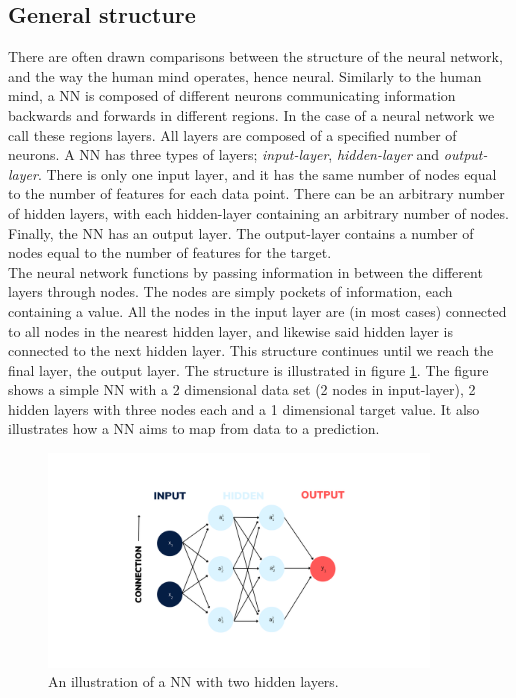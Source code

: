 \subsection{General structure}
There are often drawn comparisons between the structure of the neural network, 
and the way the human mind operates, hence neural. Similarly to the human mind, a \ac{NN} is 
composed of different neurons communicating information backwards and forwards in different 
regions. In the case of a neural network we call these regions layers. All layers
are composed of a specified number of neurons. A \ac{NN} has three types of layers;
\emph{input-layer}, \emph{hidden-layer} and \emph{output-layer}. There is only one input layer, and it has
the same number of nodes equal to the number of features for each data point. 
There can be an arbitrary number of hidden layers, with each hidden-layer containing
an arbitrary number of nodes. Finally, the \ac{NN} has an output layer. The output-layer
contains a number of nodes equal to the number of features for the target.
\\
The neural network functions by passing information in between the different layers through 
nodes. The nodes are simply pockets of information, each containing a value. 
All the nodes in the input layer are (in most cases) connected to all nodes in the nearest hidden layer,
and likewise said hidden layer is connected to the next hidden layer. This structure continues
until we reach the final layer, the output layer. The structure is illustrated in figure
\ref{fig:NN}. The figure shows a simple \ac{NN} with a 2 dimensional data set (2 nodes in input-layer),
2 hidden layers with three nodes each and a 1 dimensional target value. It also illustrates 
how a \ac{NN} aims to map from data to a prediction.
\begin{figure}
    \centering
    \vspace*{-12.5mm} 
    \includegraphics[width=0.9\textwidth]{Figures/Illustrations/Input_labels.png}
    \vspace*{-12.5mm} 
    \caption{An illustration of a \ac{NN} with two hidden layers.}
    \label{fig:NN}
\end{figure}
